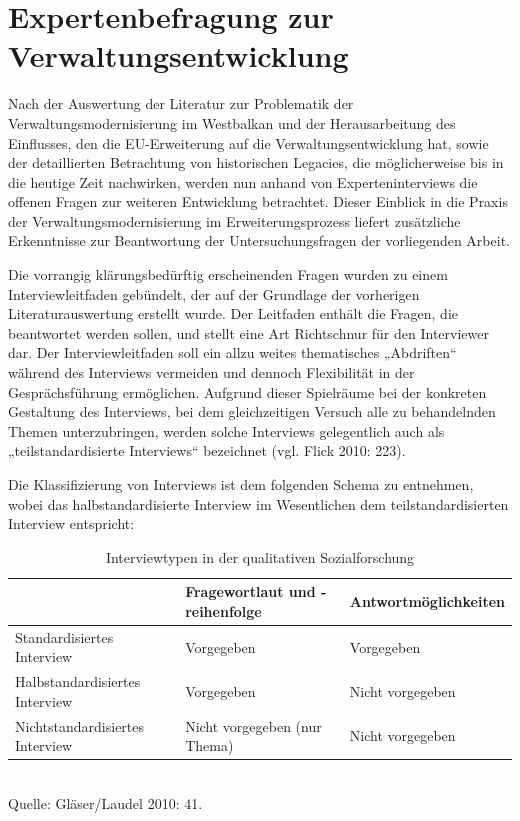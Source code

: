 \chapter{Expertenbefragung zur Verwaltungsentwicklung}
Nach der Auswertung der Literatur zur Problematik der Verwaltungsmodernisierung im Westbalkan und der Herausarbeitung des Einflusses, den die EU-Erweiterung auf die Verwaltungsentwicklung hat, sowie der detaillierten Betrachtung von historischen Legacies, die möglicherweise bis in die heutige Zeit nachwirken, werden nun anhand von Experteninterviews die offenen Fragen zur weiteren Entwicklung betrachtet. Dieser Einblick in die Praxis der Verwaltungsmodernisierung im Erweiterungsprozess liefert zusätzliche Erkenntnisse zur Beantwortung der Untersuchungsfragen der vorliegenden Arbeit.\par
Die vorrangig klärungsbedürftig erscheinenden Fragen wurden zu einem Interviewleitfaden gebündelt, der auf der Grundlage der vorherigen Literaturauswertung erstellt wurde. Der Leitfaden enthält die Fragen, die beantwortet werden sollen, und stellt eine Art Richtschnur für den Interviewer dar. Der Interviewleitfaden soll ein allzu weites thematisches „Abdriften“ während des Interviews vermeiden und dennoch Flexibilität in der Gesprächsführung ermöglichen. Aufgrund dieser Spielräume bei der konkreten Gestaltung des Interviews, bei dem gleichzeitigen Versuch alle zu behandelnden Themen unterzubringen, werden solche Interviews gelegentlich auch als „teilstandardisierte Interviews“ bezeichnet (vgl. Flick 2010: 223).\par
Die Klassifizierung von Interviews ist dem folgenden Schema zu entnehmen, wobei das halbstandardisierte Interview im Wesentlichen dem teilstandardisierten Interview entspricht:

\begin{table}[H]
\caption[Interviewtypen in der qualitativen Sozialforschung]{Interviewtypen in der qualitativen Sozialforschung}
\center
\scriptsize{
\begin{tabular}{|L{40mm}|L{40mm}|L{40mm}|}\hline
&Fragewortlaut und -reihenfolge&Antwortmöglichkeiten\\\hline
Standardisiertes Interview&
Vorgegeben&
Vorgegeben\\\hline
Halbstandardisiertes Interview&
Vorgegeben&
Nicht vorgegeben\\\hline
Nichtstandardisiertes Interview&
Nicht vorgegeben (nur Thema)&
Nicht vorgegeben\\\hline
\end{tabular}\\
\vspace{0,5cm}
Quelle: Gläser/Laudel 2010: 41. 
}
\end{table}
 
